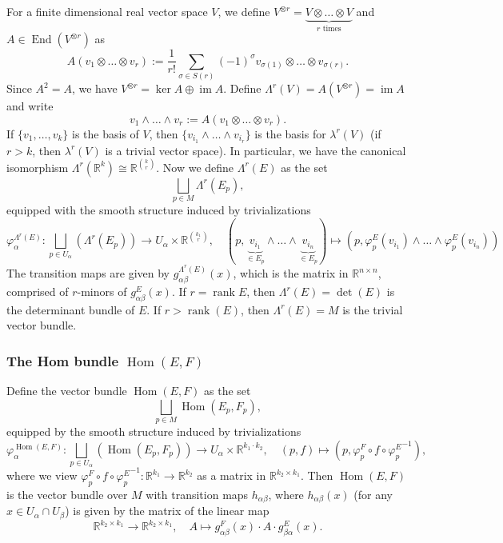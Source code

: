 \documentclass[10pt, a4paper]{article}
\newcommand{\R}{\mathbb {R}}
\DeclareMathOperator{\im}{im}
\DeclareMathOperator{\en}{End}
\DeclareMathOperator{\ho}{Hom}
\DeclareMathOperator{\rank}{rank}
\begin{document}
For a finite dimensional real vector space $V$, we define $V^{\otimes r} = \underbrace{V \otimes \dots \otimes V}_{\textrm{$r$ times}}$ and $A \in \en (V^{\otimes r })$ 
as $$A(v_1 \otimes \dots \otimes v_r) := \frac{1}{r!} \sum_{\sigma \in S(r)} (-1)^{\sigma} v_{\sigma(1)} \otimes \dots \otimes v_{\sigma (r)}.$$
Since $A^2 = A$, we have $V ^{\otimes r} = \ker A \oplus \im A$. Define $\Lambda^r (V) = A(V^{\otimes r}) = \im A$ and write 
$$v_1 \wedge \dots \wedge v_r := A(v_1 \otimes \dots \otimes v_r).$$
If $\{v_1, \dots, v_k\}$ is the basis of $V$, then $\{v_{i_1} \wedge \dots \wedge v_{i_r}\}$ is the basis for $\lambda^r (V)$ (if $r > k$, then $\lambda^r (V)$ is a trivial vector space).
In particular, we have the canonical isomorphism $\Lambda^{r} (\R^{k}) \cong \R^{\binom{k}{r}}$.
Now we define $\Lambda^r (E)$ as the set 
$$\bigsqcup_{p \in M} \Lambda^r (E_p),$$
equipped with the smooth structure induced by trivializations 
$$\varphi_\alpha ^{\Lambda^r (E)} : \bigsqcup_{p \in U_\alpha} (\Lambda^r (E_p)) \to U_\alpha \times \R^{\binom{k_1}{r}},\quad (p, \underbrace{v_{i_1}}_{\in E_p} \wedge \dots \wedge \underbrace{v_{i_n}}_{\in E_p}) \mapsto (p, {\varphi_p ^E (v_{i_1})} \wedge \dots \wedge {\varphi_p ^E(v_{i_n})})$$
The transition maps are given by $g_{\alpha \beta} ^{\Lambda^r (E)} (x)$, which is
the matrix in $\R^{n \times n}$, comprised of $r$-minors of $g_{\alpha \beta} ^E (x)$. If $r = \rank E$, then $\Lambda^r (E) = \det (E)$ is the determinant bundle of $E$.
If $r >  \rank (E)$, then $\Lambda^r (E) = M$ is the trivial vector bundle.

\subsubsection*{The Hom bundle $\ho (E, F)$}

Define the vector bundle $\ho (E, F)$ as the set
$$\bigsqcup_{p \in M} \ho (E_p, F_p),$$
equipped by the smooth structure induced by trivializations 
$$\varphi_\alpha ^{\ho (E, F)} : \bigsqcup_{p \in U_\alpha} (\ho (E_p, F_p)) \to U_\alpha \times \R^{k_1 \cdot k_2},\quad (p, f) \mapsto (p, \varphi^F _p \circ f \circ {\varphi^E _p}^{-1}),$$
where we view $\varphi^F _p \circ f \circ {\varphi^E _p}^{-1}: \R^{k_1} \to \R^{k_2}$ as a matrix in $\R^{k_2 \times k_1}$.
Then $\ho (E, F)$ is the vector bundle over $M$ with transition maps $h_{\alpha \beta}$,
where $h_{\alpha \beta} (x)$ (for any $x \in U_\alpha \cap U_\beta$) is given by the matrix of the linear map
$$\R^{k_2 \times k_1} \to \R^{k_2 \times k_1},\quad A \mapsto g_{\alpha \beta} ^F (x) \cdot A \cdot g_{\beta \alpha } ^E (x).$$
\end{document}
